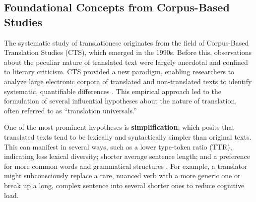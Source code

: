 \documentclass[11pt,a4paper]{article}
\begin{document}
\subsection{Foundational Concepts from Corpus-Based Studies}

The systematic study of translationese originates from the field of Corpus-Based Translation Studies (CTS), which emerged in the 1990s. Before this, observations about the peculiar nature of translated text were largely anecdotal and confined to literary criticism. CTS provided a new paradigm, enabling researchers to analyze large electronic corpora of translated and non-translated texts to identify systematic, quantifiable differences \cite{laviosa1998corpus}. This empirical approach led to the formulation of several influential hypotheses about the nature of translation, often referred to as ``translation universals.''

One of the most prominent hypotheses is \textbf{simplification}, which posits that translated texts tend to be lexically and syntactically simpler than original texts. This can manifest in several ways, such as a lower type-token ratio (TTR), indicating less lexical diversity; shorter average sentence length; and a preference for more common words and grammatical structures \cite{baker1993corpus}. For example, a translator might subconsciously replace a rare, nuanced verb with a more generic one or break up a long, complex sentence into several shorter ones to reduce cognitive load.
\end{document}
